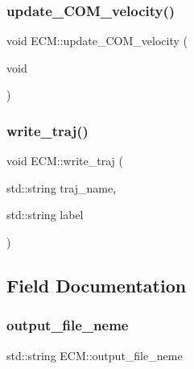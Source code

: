 \subsubsection{\texorpdfstring{update\_COM\_velocity()}{update\_COM\_velocity()}}
{\footnotesize\ttfamily void E\+C\+M\+::update\+\_\+\+C\+O\+M\+\_\+velocity (\begin{DoxyParamCaption}\item[{void}]{ }\end{DoxyParamCaption})\hspace{0.3cm}{\ttfamily [inline]}}

\mbox{\label{classECM_acf7ff0e1b7a7631eff70c8584d01c050}} 
\subsubsection{\texorpdfstring{write\_traj()}{write\_traj()}}
{\footnotesize\ttfamily void E\+C\+M\+::write\+\_\+traj (\begin{DoxyParamCaption}\item[{std\+::string}]{traj\+\_\+name,  }\item[{std\+::string}]{label }\end{DoxyParamCaption})}



\subsection{Field Documentation}
\mbox{\label{classECM_a14bf2404f3c94c4e4e372c5eb9fd70cf}} 
\subsubsection{\texorpdfstring{output\_file\_neme}{output\_file\_neme}}
{\footnotesize\ttfamily std\+::string E\+C\+M\+::output\+\_\+file\+\_\+neme}



